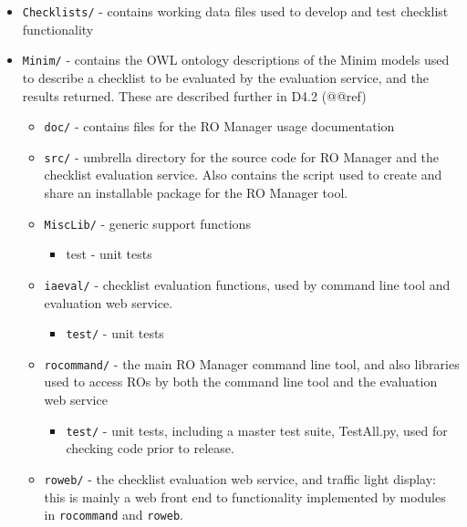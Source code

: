 \begin{itemize}

\item \texttt{Checklists/} - contains working data files used to develop and test checklist functionality
\item \texttt{Minim/} - contains the OWL ontology descriptions of the Minim models used to describe a checklist to be evaluated by the evaluation service, and the results returned.  These are described further in D4.2 (@@ref)
\begin{itemize}

\item \texttt{doc/} - contains files for the RO Manager usage documentation
\item \texttt{src/} - umbrella directory for the source code for RO Manager and the checklist evaluation service.  Also contains the script used to create and share an installable package for the RO Manager tool.
\item \texttt{MiscLib/} - generic support functions
\begin{itemize}

\item test - unit tests
\end{itemize}


\item \texttt{iaeval/} - checklist evaluation functions, used by command line tool and evaluation web service.
\begin{itemize}

\item \texttt{test/} - unit tests
\end{itemize}


\item \texttt{rocommand/} - the main RO Manager command line tool, and also libraries used to access ROs by both the command line tool and the evaluation web service
\begin{itemize}

\item \texttt{test/} - unit tests, including a master test suite, TestAll.py, used for checking code prior to release.
\end{itemize}


\item \texttt{roweb/} - the checklist evaluation web service, and traffic light display: this is mainly a web front end to functionality implemented by modules in \texttt{rocommand} and \texttt{roweb}.
\begin{itemize}


\end{itemize}
\end{itemize}
\end{itemize}
